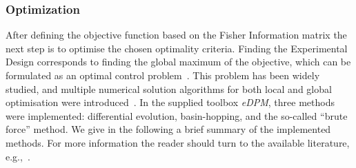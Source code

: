\documentclass[10pt,A4paper]{article}
\begin{document}
\subsubsection*{Optimization}
After defining the objective function based on the Fisher Information matrix the next step is to optimise the chosen optimality criteria.
Finding the Experimental Design corresponds to finding the global maximum of the objective, which can be formulated as an optimal control problem~\cite{espie_optimal_1989}.
This problem has been widely studied, and multiple numerical solution algorithms for both local and global optimisation were introduced~\cite{esposito_global_2000, bangaImprovingFoodProcessing2003, ali_numerical_1997, runarsson_stochastic_2000}.
In the supplied toolbox {\it eDPM}, three methods were implemented: differential evolution, basin-hopping, and the so-called “brute force” method.
We give in the following a brief summary of the implemented methods.
For more information the reader should turn to the available literature, e.g.,~\cite{stornDifferentialEvolutionSimple1997, walesGlobalOptimizationBasinHopping1997}.
\newline
\end{document}
